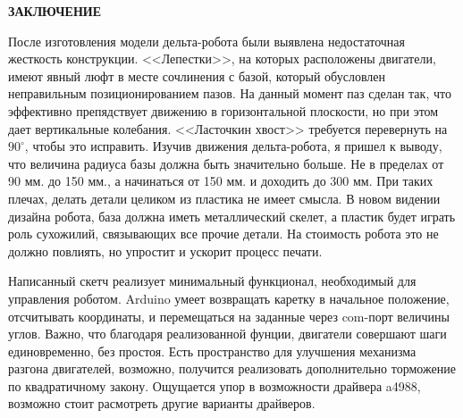 \begin{center}
\large{\textbf{ЗАКЛЮЧЕНИЕ}}\\
\end{center}

После изготовления модели дельта-робота были выявлена недостаточная жесткость конструкции. <<Лепестки>>, на которых расположены двигатели, имеют явный люфт в месте сочлинения с базой, который обусловлен неправильным позиционированием пазов. На данный момент паз сделан так, что эффективно препядствует движению в горизонтальной плоскости, но при этом дает вертикальные колебания. <<Ласточкин хвост>> требуется перевернуть на $90^{\circ}$, чтобы это исправить.
Изучив движения дельта-робота, я пришел к выводу, что величина радиуса базы должна быть значительно больше. Не в пределах от 90 мм. до 150 мм., а начинаться от 150 мм. и доходить до 300 мм. При таких плечах, делать детали целиком из пластика не имеет смысла. В новом видении дизайна робота, база должна иметь металлический скелет, а пластик будет играть роль сухожилий, связывающих все прочие детали. На стоимость робота это не должно повлиять, но упростит и ускорит процесс печати.

Написанный  скетч реализует минимальный функционал, необходимый для управления роботом. Arduino умеет возвращать каретку в начальное положение, отсчитывать координаты, и перемещаться на заданные через com-порт величины углов. Важно, что благодаря реализованной фунции, двигатели совершают шаги единовременно, без простоя. Есть пространство для улучшения механизма разгона двигателей, возможно, получится реализовать дополнительно торможение по квадратичному закону. Ощущается упор в возможности драйвера a4988, возможно стоит расмотреть другие варианты драйверов.  

